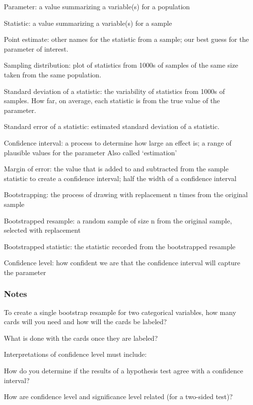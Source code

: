 \documentclass[
]{report}
\newcommand{\rgs}{\vspace{12pt}} %
\newcommand{\rgi}{\hspace{24pt}}  %
\begin{document}
Parameter: a value summarizing a variable(s) for a population

Statistic: a value summarizing a variable(s) for a sample

Point estimate: other names for the statistic from a sample; our best guess for the parameter of interest.

Sampling distribution: plot of statistics from 1000s of samples of the same size taken from the same population.

Standard deviation of a statistic: the variability of statistics from 1000s of samples. How far, on average, each statistic is from the true value of the parameter.

Standard error of a statistic: estimated standard deviation of a statistic.

Confidence interval: a process to determine how large an effect is; a range of plausible values for the parameter
\rgi Also called `estimation'

Margin of error: the value that is added to and subtracted from the sample statistic to create a confidence interval; half the width of a confidence interval

Bootstrapping: the process of drawing with replacement n times from the original sample

Bootstrapped resample: a random sample of size n from the original sample, selected with replacement

Bootstrapped statistic: the statistic recorded from the bootstrapped resample

Confidence level: how confident we are that the confidence interval will capture the parameter

\hypertarget{notes-22}{%
\subsubsection*{Notes}\label{notes-22}}

To create a single bootstrap resample for two categorical variables, how many cards will you need and how will the cards be labeled?
\rgs

What is done with the cards once they are labeled?
\rgs

Interpretations of confidence level must include:
\rgs
\rgs

How do you determine if the results of a hypothesis test agree with a confidence interval?
\rgs
\rgs

How are confidence level and significance level related (for a two-sided test)?
\rgs
\end{document}
